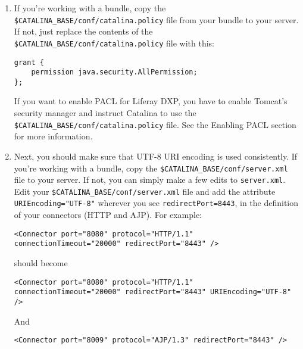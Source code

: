 \begin{enumerate}
\begin{verbatim}
common.loader="${catalina.base}/lib","${catalina.base}/lib/*.jar","${catalina.home}/lib","${catalina.home}/lib/*.jar","${catalina.base}/lib/ext/global","${catalina.base}/lib/ext/global/*.jar","${catalina.base}/lib/ext","${catalina.base}/lib/ext/*.jar"
\end{verbatim}

  This allows Catalina to access the JARs that you copied to
  \texttt{\$CATALINA\_BASE/lib/ext}.
\item
  If you're working with a bundle, copy the
  \texttt{\$CATALINA\_BASE/conf/catalina.policy} file from your bundle
  to your server. If not, just replace the contents of the
  \texttt{\$CATALINA\_BASE/conf/catalina.policy} file with this:

\begin{verbatim}
grant {
    permission java.security.AllPermission;
};
\end{verbatim}

  If you want to enable PACL for Liferay DXP, you have to enable
  Tomcat's security manager and instruct Catalina to use the
  \texttt{\$CATALINA\_BASE/conf/catalina.policy} file. See the Enabling
  PACL section for more information.
\item
  Next, you should make sure that UTF-8 URI encoding is used
  consistently. If you're working with a bundle, copy the
  \texttt{\$CATALINA\_BASE/conf/server.xml} file to your server. If not,
  you can simply make a few edits to \texttt{server.xml}. Edit your
  \texttt{\$CATALINA\_BASE/conf/server.xml} file and add the attribute
  \texttt{URIEncoding="UTF-8"} wherever you see
  \texttt{redirectPort=8443}, in the definition of your connectors (HTTP
  and AJP). For example:

\begin{verbatim}
<Connector port="8080" protocol="HTTP/1.1" connectionTimeout="20000" redirectPort="8443" />
\end{verbatim}

  should become

\begin{verbatim}
<Connector port="8080" protocol="HTTP/1.1" connectionTimeout="20000" redirectPort="8443" URIEncoding="UTF-8" />
\end{verbatim}

  And

\begin{verbatim}
<Connector port="8009" protocol="AJP/1.3" redirectPort="8443" />
\end{verbatim}


\end{enumerate}
